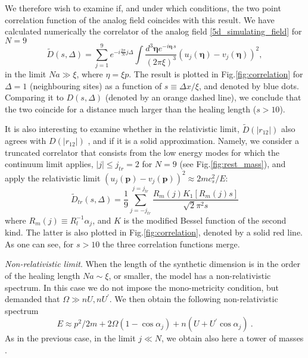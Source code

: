 \documentclass[aps,prl,twocolumn,unsortedaddress,superscriptaddress]{revtex4-1}
\newcommand{\p}{\mathbf{p}}
\begin{document}
\noindent We therefore wish to examine if, and under which conditions, the two point correlation function of the analog field coincides with this result.
We have calculated numerically the correlator of the analog field \eqref{5d_simulating_field} for $N=9$
\begin{equation}\label{simulating_corr}
\tilde{D}(s,\Delta)=\sum_{j=1}^{9}e^{-i\frac{2\pi}{N}j\Delta}\int\frac{d^{3}\mathbf{\eta} e^{-i\mathbf{\eta}\,s}}{(2\pi\xi)^{3}}(u_j(\mathbf{\eta})-v_j(\mathbf{\eta}))^{2},
\end{equation}
in the limit $Na\gg \xi$, where $\eta=\xi p$.
The result is plotted in Fig.\ref{fig:correlation} for $\Delta=1$ (neighbouring sites) as a function of $s\equiv \Delta x/\xi$, and denoted by blue dots.
Comparing it to $D(s,\Delta)$ (denoted by an orange dashed line), we conclude that the two coincide for a distance much larger than the healing length ($s>10$).

It is also interesting to examine whether in the relativistic limit, $\tilde{D}(|r_{12}|)$ also agrees with $D(|r_{12}|)$ , and if it is a solid approximation.
Namely, we consider a truncated correlator that consists from the low energy modes for which the continuum limit applies, $|j|\leq j_{tr}=2$ for $N=9$ (see Fig.\ref{fig:rest_mass}), and apply the relativistic limit $(u_j(\p)-v_j(\p))^{2}\approx 2mc_s^{2}/E$:
\begin{equation}\label{trun_corr}
\tilde{D}_{tr}(s,\Delta)=\frac{1}{9}\sum_{j=-j_{tr}}^{j=j_{tr}}\frac{R_{m}(j) K_1[R_{m}(j)s]}{\sqrt{2} \pi ^2 s}
\end{equation}
where $R_{m}(j)\equiv R_l^{-1}\alpha_j$, and $K$ is the modified Bessel function of the second kind.
The latter is also plotted in Fig.\ref{fig:correlation}, denoted by a solid red line.
As one can see, for $s>10$ the three correlation functions merge.

\vspace{.3cm}

{\em Non-relativistic limit}.
When the length of the synthetic dimension is in the order of the healing length $Na\sim \xi$,  or smaller, the model has a non-relativistic spectrum. 
In this case we do not impose the mono-metricity condition, but demanded that $\Omega\gg nU,nU^{\prime}$.
We then obtain the following non-relativistic spectrum
\begin{equation}\label{non_rel_dispersion}
E\approx p^{2}/2m+2\Omega(1-\cos\alpha_j)+n(U+U^{\prime}\cos\alpha_j)~.
\end{equation}
As in the previous case, in the limit $j\ll N$, we obtain also here a tower of masses \cite{lewenstein2012}. 
\end{document}
